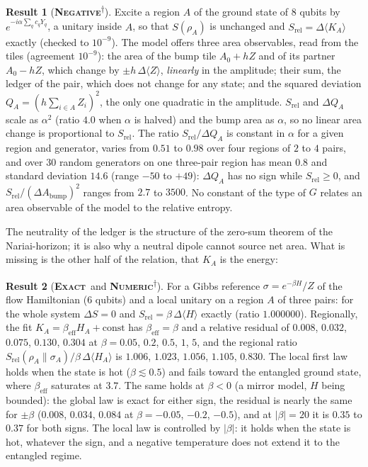 \documentclass[11pt]{article}
\newcommand{\exact}{\textbf{\textsc{Exact}}}
\newcommand{\numeric}{\textbf{\textsc{Numeric}}}
\newcommand{\negres}{\textbf{\textsc{Negative}}}
\newcommand{\snap}{\textsuperscript{$\dagger$}}      %
\theoremstyle{definition}
\newtheorem{result}{Result}
\begin{document}
\begin{result}[\negres\snap]\label{res:rel-area}
Excite a region $A$ of the ground state of $8$ qubits by $e^{-i\alpha\sum_q c_qY_q}$, a unitary inside $A$, so that $S(\rho_A)$ is unchanged and $S_{\mathrm{rel}}=\Delta\langle K_A\rangle$ exactly (checked to $10^{-9}$). The model offers three area observables, read from the tiles (agreement $10^{-9}$): the area of the bump tile $A_0+hZ$ and of its partner $A_0-hZ$, which change by $\pm h\,\Delta\langle Z\rangle$, \emph{linearly} in the amplitude; their sum, the ledger of the pair, which does not change for any state; and the squared deviation $Q_A=(h\sum_{i\in A}Z_i)^2$, the only one quadratic in the amplitude. $S_{\mathrm{rel}}$ and $\Delta Q_A$ scale as $\alpha^2$ (ratio $4.0$ when $\alpha$ is halved) and the bump area as $\alpha$, so no linear area change is proportional to $S_{\mathrm{rel}}$. The ratio $S_{\mathrm{rel}}/\Delta Q_A$ is constant in $\alpha$ for a given region and generator, varies from $0.51$ to $0.98$ over four regions of $2$ to $4$ pairs, and over $30$ random generators on one three-pair region has mean $0.8$ and standard deviation $14.6$ (range $-50$ to $+49$): $\Delta Q_A$ has no sign while $S_{\mathrm{rel}}\ge0$, and $S_{\mathrm{rel}}/(\Delta A_{\mathrm{bump}})^2$ ranges from $2.7$ to $3500$. No constant of the type of $G$ relates an area observable of the model to the relative entropy.
\end{result}
The neutrality of the ledger is the structure of the zero-sum theorem of the Nariai-horizon; it is also why a neutral dipole cannot source net area. What is missing is the other half of the relation, that $K_A$ is the energy:
\begin{result}[\exact\ and \numeric\snap]\label{res:rel-thermal}
For a Gibbs reference $\sigma=e^{-\beta H}/Z$ of the flow Hamiltonian ($6$ qubits) and a local unitary on a region $A$ of three pairs: for the whole system $\Delta S=0$ and $S_{\mathrm{rel}}=\beta\,\Delta\langle H\rangle$ exactly (ratio $1.000000$). Regionally, the fit $K_A=\beta_{\mathrm{eff}}H_A+\mathrm{const}$ has $\beta_{\mathrm{eff}}=\beta$ and a relative residual of $0.008$, $0.032$, $0.075$, $0.130$, $0.304$ at $\beta=0.05$, $0.2$, $0.5$, $1$, $5$, and the regional ratio $S_{\mathrm{rel}}(\rho_A\|\sigma_A)/\beta\,\Delta\langle H_A\rangle$ is $1.006$, $1.023$, $1.056$, $1.105$, $0.830$. The local first law holds when the state is hot ($\beta\lesssim0.5$) and fails toward the entangled ground state, where $\beta_{\mathrm{eff}}$ saturates at $3.7$. The same holds at $\beta<0$ (a mirror model, $H$ being bounded): the global law is exact for either sign, the residual is nearly the same for $\pm\beta$ ($0.008$, $0.034$, $0.084$ at $\beta=-0.05$, $-0.2$, $-0.5$), and at $|\beta|=20$ it is $0.35$ to $0.37$ for both signs. The local law is controlled by $|\beta|$: it holds when the state is hot, whatever the sign, and a negative temperature does not extend it to the entangled regime.
\end{result}
\end{document}
